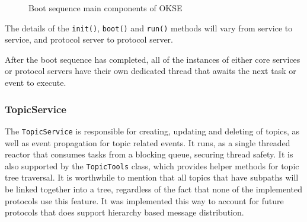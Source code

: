 \begin{center}
  \begin{figure}[ht!]
    \caption{Boot sequence main components of OKSE}
    \label{fig:boot-sequence}
  \end{figure}
\end{center}

The details of the \verb!init()!, \verb!boot()! and \verb!run()! methods will vary from service to service, and protocol server to protocol server.

After the boot sequence has completed, all of the instances of either core services or protocol servers have their own dedicated thread that awaits the next task or event to execute.

\subsubsection{TopicService}
\label{subsec:architecture_and_implementation-implementation-core-topicservice}

The \verb!TopicService! is responsible for creating, updating and  deleting of topics, as well as event propagation for topic related events. It runs, as a single threaded reactor that consumes tasks from a blocking queue, securing thread safety. It is also supported by the \verb!TopicTools! class, which provides helper methods for topic tree traversal. It is worthwhile to mention that all topics that have subpaths will be linked together into a tree, regardless of the fact that none of the implemented protocols use this feature. It was implemented this way to account for future protocols that does support hierarchy based message distribution.

